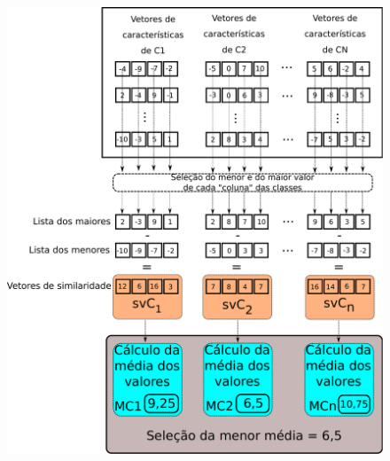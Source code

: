 \documentclass{beamer}
\begin{document}
\begin{frame}
{\begin{figure}
				\centering
				\includegraphics[height=0.82\textheight]{../monografia/images/calculoAlpha}
				\label{fig:calculoalpha}
			\end{figure}
		}
\end{frame}
\end{document}

